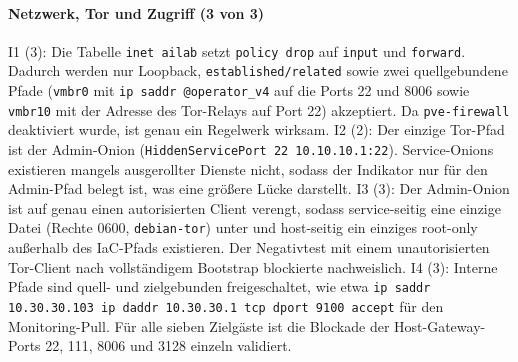 {\paragraph{Netzwerk, Tor und Zugriff (3 von 3)}
I1 (3): Die Tabelle \texttt{inet ailab} setzt \texttt{policy drop} auf \texttt{input} und \texttt{forward}. Dadurch werden nur Loopback, \texttt{established/related} sowie zwei quellgebundene Pfade (\texttt{vmbr0} mit \texttt{ip saddr @operator\_v4} auf die Ports 22 und 8006
sowie \texttt{vmbr10} mit der Adresse des Tor-Relays auf Port 22) akzeptiert.
Da \texttt{pve-firewall} deaktiviert wurde, ist genau ein Regelwerk wirksam.\cite{section4scriptB,finalsummaryB}
I2 (2): Der einzige Tor-Pfad ist der Admin-Onion (\texttt{HiddenServicePort 22 10.10.10.1:22}). Service-Onions existieren mangels ausgerollter Dienste nicht, sodass der Indikator nur für den
Admin-Pfad belegt ist, was eine größere Lücke darstellt.\cite{section4scriptB,finalsummaryB}
I3 (3): Der Admin-Onion ist auf genau einen autorisierten Client verengt, sodass service-seitig eine einzige Datei  (Rechte 0600, \texttt{debian-tor}) unter  und host-seitig ein einziges root-only  außerhalb des \ac{IaC}-Pfads existieren.
Der Negativtest mit einem unautorisierten Tor-Client nach vollständigem Bootstrap blockierte nachweislich.\cite{implementationlogB,validatornotesB,torprojectClientAuth}
I4 (3): Interne Pfade sind quell- und zielgebunden freigeschaltet, wie etwa \texttt{ip saddr 10.30.30.103 ip daddr 10.30.30.1 tcp dport 9100 accept} für den Monitoring-Pull.
Für alle sieben Zielgäste ist die Blockade der Host-Gateway-Ports 22, 111, 8006 und 3128 einzeln validiert.\cite{section5scriptB,implementationlogB,finalsummaryB}

}
